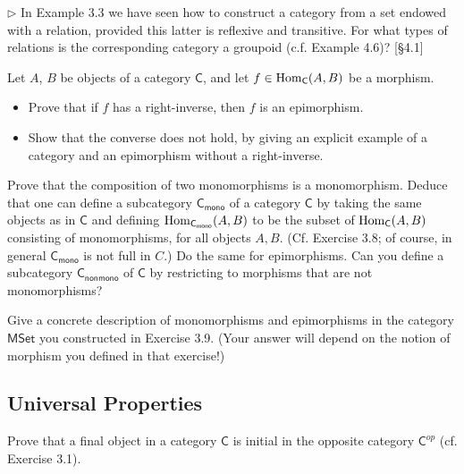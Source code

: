 \begin{problem}
  $\rhd$ In Example 3.3 we have seen how to construct a category from a set
  endowed with a relation, provided this latter is reflexive and transitive.
  For what types of relations is the corresponding category a groupoid (c.f.
  Example 4.6)? [\S 4.1]
\end{problem}

\begin{problem}
  \def \C {\mathsf{C}}
  Let $A$, $B$ be objects of a category $\C$, and let $f \in \Hom_\C(A, B)$
  be a morphism.
  \begin{itemize}
    \item Prove that if $f$ has a right-inverse, then $f$ is an epimorphism.
    \item Show that the converse does not hold, by giving an explicit example
    of a category and an epimorphism without a right-inverse.
  \end{itemize}
\end{problem}

\begin{problem}
  \def \C {\mathsf{C}}
  \def \mono {\mathsf{mono}}
  \def \nonmono {\mathsf{nonmono}}

  Prove that the composition of two monomorphisms is a monomorphism. Deduce
  that one can define a subcategory $\C_\mono$ of a category $\C$ by taking
  the same objects as in $\C$ and defining $\Hom_{\C_\mono}(A, B)$ to be the
  subset of $\Hom_\C(A, B)$ consisting of monomorphisms, for all objects $A,
  B$. (Cf. Exercise 3.8; of course, in general $\C_\mono$ is not full in
  $C$.) Do the same for epimorphisms. Can you define a subcategory
  $\C_\nonmono$ of $\C$ by restricting to morphisms that are not
  monomorphisms?
\end{problem}

\begin{problem}
  \def \MSet {\mathsf{MSet}}
  Give a concrete description of monomorphisms and epimorphisms in the
  category $\MSet$ you constructed in Exercise 3.9. (Your answer will depend
  on the notion of morphism you defined in that exercise!)
\end{problem}

\subsection{Universal Properties}

\begin{problem}
  \def \C {\mathsf{C}}
  \def \Cop {{\mathsf{C}^{op}}}
  Prove that a final object in a category $\C$ is initial in the opposite
  category $\Cop$ (cf. Exercise 3.1).
\end{problem}


